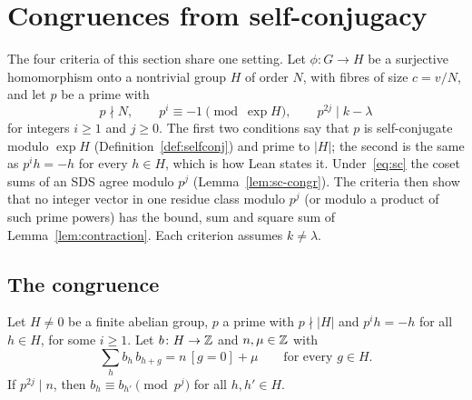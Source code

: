 
\section{Congruences from self-conjugacy}\label{sec:congruences}

The four criteria of this section share one setting. Let $\phi \colon G \to H$ be a surjective
homomorphism onto a nontrivial group $H$ of order $N$, with fibres of size $c = v/N$, and let
$p$ be a prime with
\begin{equation}\label{eq:sc}
  p \nmid N, \qquad p^i \equiv -1 \pmod{\exp H}, \qquad p^{2j} \mid k - \lambda
\end{equation}
for integers $i \ge 1$ and $j \ge 0$. The first two conditions say that $p$ is self-conjugate modulo
$\exp H$ (Definition~\ref{def:selfconj}) and prime to $|H|$; the second is the same as
$p^i h = -h$ for every $h \in H$, which is how Lean states it. Under~\eqref{eq:sc} the coset
sums of an SDS agree modulo $p^j$ (Lemma~\ref{lem:sc-congr}). The criteria then show that no
integer vector in one residue class modulo $p^j$ (or modulo a product of such prime powers)
has the bound, sum and square sum of Lemma~\ref{lem:contraction}. Each criterion assumes
$k \neq \lambda$.

\subsection{The congruence}

\begin{lemma}\label{lem:sc-congr}
Let $H \neq 0$ be a finite abelian group, $p$ a prime with $p \nmid |H|$ and $p^i h = -h$ for
all $h \in H$, for some $i \ge 1$. Let $b \colon H \to \mathbb{Z}$ and $n, \mu \in \mathbb{Z}$ with
\[
  \sum_{h} b_h\, b_{h+g} = n\,[g = 0] + \mu \qquad \text{for every } g \in H.
\]
If $p^{2j} \mid n$, then $b_h \equiv b_{h'} \pmod{p^j}$ for all $h, h' \in H$.
\end{lemma}

